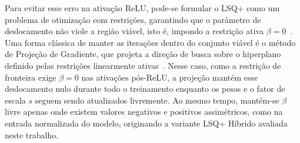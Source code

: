 Para evitar esse erro na ativação ReLU, pode-se formular o LSQ+ como um problema de otimização com restrições, garantindo que o parâmetro de deslocamento não viole a região viável,
isto é, impondo a restrição ativa $\beta = 0$~\cite{antoniou2007,souza2026}. Uma forma clássica de manter as iterações dentro do conjunto viável é o método de Projeção de Gradiente,  
que projeta a direção de busca sobre o hiperplano definido pelas restrições linearmente ativas~\cite{souza2026}. Nesse caso, como a restrição de fronteira exige $\beta = 0$ nas       
ativações pós-ReLU, a projeção mantém esse deslocamento nulo durante todo o treinamento enquanto os pesos e o fator de escala $s$ seguem sendo atualizados livremente.           
Ao mesmo tempo, mantém-se $\beta$ livre apenas onde existem valores negativos e positivos assimétricos, como na entrada normalizada do modelo, originando a variante LSQ+ Híbrido       
avaliada neste trabalho.
